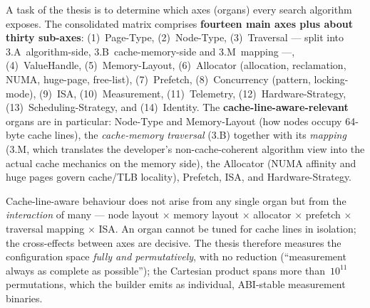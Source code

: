 A task of the thesis is to determine which axes (organs) every search algorithm
exposes. The consolidated matrix comprises \textbf{fourteen main axes plus about
thirty sub-axes}: (1)~Page-Type, (2)~Node-Type, (3)~Traversal --- split into
3.A~algorithm-side, 3.B~cache-memory-side and 3.M~mapping ---, (4)~ValueHandle,
(5)~Memory-Layout, (6)~Allocator (allocation, reclamation, NUMA, huge-page,
free-list), (7)~Prefetch, (8)~Concurrency (pattern, locking-mode), (9)~ISA,
(10)~Measurement, (11)~Telemetry, (12)~Hardware-Strategy, (13)~Scheduling-Strategy,
and (14)~Identity. The \textbf{cache-line-aware-relevant} organs are in
particular: Node-Type and Memory-Layout (how nodes occupy 64-byte cache lines),
the \emph{cache-memory traversal} (3.B) together with its \emph{mapping} (3.M,
which translates the developer's non-cache-coherent algorithm view into the
actual cache mechanics on the memory side), the Allocator (NUMA affinity and
huge pages govern cache/TLB locality), Prefetch, ISA, and Hardware-Strategy.

Cache-line-aware behaviour does not arise from any single organ but from the
\emph{interaction} of many --- node layout $\times$ memory layout $\times$
allocator $\times$ prefetch $\times$ traversal mapping $\times$ ISA. An organ
cannot be tuned for cache lines in isolation; the cross-effects between axes are
decisive. The thesis therefore measures the configuration space \emph{fully and
permutatively}, with no reduction (``measurement always as complete as
possible''); the Cartesian product spans more than~$10^{11}$ permutations, which
the builder emits as individual, ABI-stable measurement binaries.

